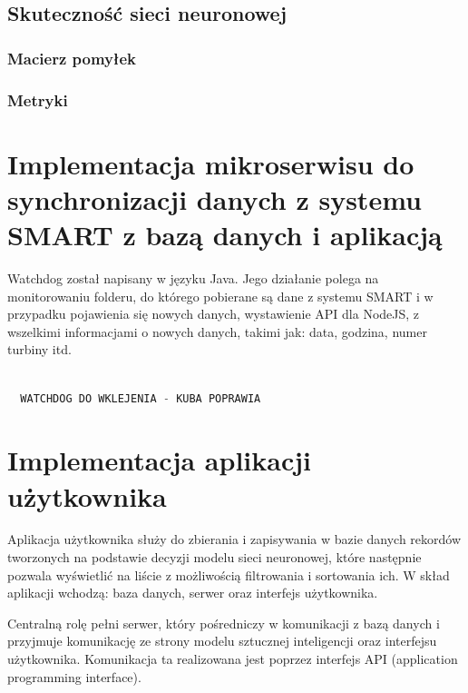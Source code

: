 \documentclass{sprz}
\begin{document}
\section{Skuteczność sieci neuronowej}

\subsection{Macierz pomyłek}

\subsection{Metryki}

\chapter{Implementacja mikroserwisu do synchronizacji danych z systemu SMART z bazą danych i aplikacją}

Watchdog został napisany w języku Java. Jego działanie polega na monitorowaniu folderu, do którego pobierane są dane z systemu SMART i w przypadku pojawienia się nowych danych, wystawienie API dla NodeJS, z wszelkimi informacjami o nowych danych, takimi jak: data, godzina, numer turbiny itd. 

\begin{lstlisting}[language=Java,caption={Implementacja watchdoga do synchronizacji dźwięków z systemu SMART z bazą danych i aplikacją}, label={lst:watchdog}]

  WATCHDOG DO WKLEJENIA - KUBA POPRAWIA

\end{lstlisting}
\clearpage


\chapter{Implementacja aplikacji użytkownika}

Aplikacja użytkownika służy do zbierania i zapisywania w bazie danych rekordów tworzonych na podstawie decyzji modelu sieci neuronowej, które następnie pozwala wyświetlić na liście z możliwością filtrowania i sortowania ich. W skład aplikacji wchodzą: baza danych, serwer oraz interfejs użytkownika.

Centralną rolę pełni serwer, który pośredniczy w komunikacji z bazą danych i przyjmuje komunikację ze strony modelu sztucznej inteligencji oraz interfejsu użytkownika. Komunikacja ta realizowana jest poprzez interfejs API (application programming interface).
\clearpage
\end{document}
